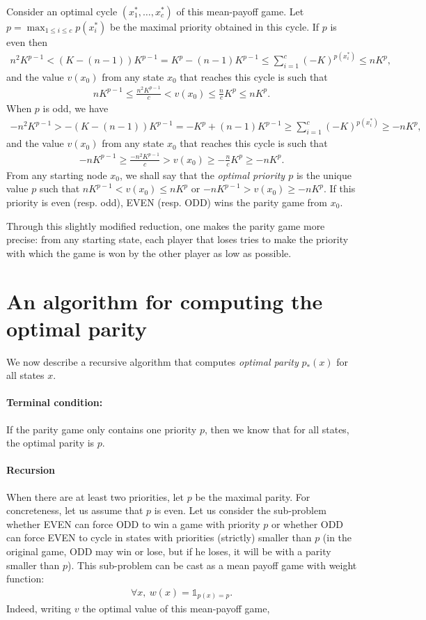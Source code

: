 \documentclass{article}
\def\1{{\mathds 1}}
\begin{document}
Consider an optimal cycle $(x^*_1,\dots,x^*_c)$ of this mean-payoff game. Let $p=\max_{1 \le i \le c} p(x^*_i)$ be the maximal priority obtained in this cycle. If $p$ is even then
\begin{align}
n^2 K^{p-1} <  (K-(n-1))K^{p-1} =   K^p - (n-1) K^{p-1}  \le \sum_{i=1}^{c} (-K)^{p(x^*_i)} \le n K^p,
\end{align}
and the value $v(x_0)$ from any state $x_0$ that reaches this cycle is such that
\begin{align}
  n K^{p-1} \le \frac{n^2 K^{p-1}}{c} < v(x_0) \le \frac{n}{c} K^p \le n K^p. 
\end{align}
When $p$ is odd, we have
\begin{align}
  - n^2 K^{p-1} > -(K-(n-1))K^{p-1} =   -K^p + (n-1) K^{p-1} \ge \sum_{i=1}^{c} (-K)^{p(x^*_i)} \ge -n K^p,
\end{align}
and the value $v(x_0)$ from any state $x_0$ that reaches this cycle is such that
\begin{align}
  -n K^{p-1} \ge \frac{-n^2 K^{p-1}}{c} > v(x_0) \ge -\frac{n}{c}K^p \ge - n K^p. 
\end{align}
From any starting node $x_0$, we shall say that the \emph{optimal priority $p$} is the unique value $p$ such that $n K^{p-1} < v(x_0) \le n K^p$ or $-n K^{p-1} > v(x_0) \ge -n K^p$. If this priority is even (resp. odd), EVEN (resp. ODD) wins the parity game from $x_0$.

Through this slightly modified reduction, one makes the parity game more precise: from any starting state, each player that loses tries to make the priority with which the game is won by the other player as low as possible. 


\section{An algorithm for computing the optimal parity}

We now describe a recursive algorithm that computes \emph{optimal parity} $p_*(x)$ for all states $x$.
\paragraph{Terminal condition:} If the parity game only contains one priority $p$, then we know that for all states, the optimal parity is $p$.
\paragraph{Recursion} When there are at least two priorities, let $p$ be the maximal parity. For concreteness, let us assume that $p$ is even.
Let us consider the sub-problem whether EVEN can force ODD to win a game with priority $p$ or whether ODD can force EVEN to cycle in states with priorities (strictly) smaller than $p$ (in the original game, ODD may win or lose, but if he loses, it will be with a parity smaller than $p$). This sub-problem can be cast as a mean payoff game with weight function:
\begin{align}
  \forall x,~ w(x) = \1_{p(x)=p}.
\end{align}
Indeed, writing $v$ the optimal value of this mean-payoff game,
\end{document}
